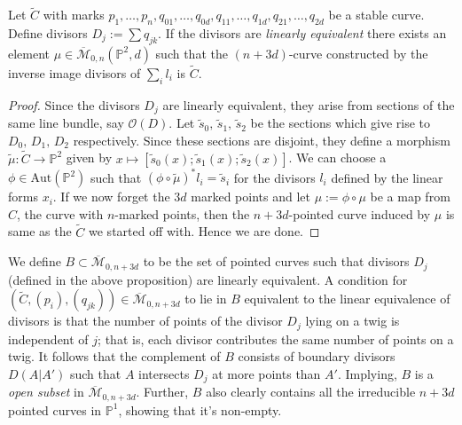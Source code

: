 \begin{proposition}
    Let $\tilde{C}$ with marks $p_{1},\allowbreak \dots,\allowbreak p_{n},\allowbreak q_{01},\allowbreak \dots,\allowbreak q_{0d} ,\allowbreak q_{11},\allowbreak \dots,\allowbreak q_{1d},\allowbreak q_{21},\allowbreak \dots,\allowbreak q_{2d}$ be a stable curve.
    Define divisors $D_{j}:= \sum q_{jk}$.
    If the divisors are \textit{linearly equivalent} there exists an element $\mu \in \overline{\mathcal{M}}_{0,n}(\mathbb{P}^{2},d)$ such that the $(n+3d)$-curve constructed by the inverse image divisors of $\sum_{i}l_{i}$ is $\tilde{C}$.
\end{proposition}
\begin{proof}
    Since the divisors $D_{j}$ are linearly equivalent, they arise from sections of the same line bundle, say $\mathcal{O}(D)$.
    Let $\tilde{s}_{0},\, \tilde{s}_{1},\,\tilde{s}_{2}$ be the sections which give rise to $D_{0},\,D_{1},\,D_{2}$ respectively.
    Since these sections are disjoint, they define a morphism $\tilde{\mu}: \tilde C \to \mathbb{P}^{2}$ given by $x \mapsto [\tilde{s}_{0}(x);\tilde{s}_{1}(x);\tilde{s}_{2}(x)]$.
    We can choose a $\phi \in \text{Aut}(\mathbb{P}^{2})$ such that $(\phi \circ \tilde{\mu})^{*}l_{i} = \tilde{s}_{i}$ for the divisors $l_{i}$ defined by the linear forms $x_{i}$.
    If we now forget the $3d$ marked points and let $\mu := \phi \circ \mu$ be a map from $C$, the curve with $n$-marked points, then the $n+3d$-pointed curve induced by $\mu$ is same as the $\tilde{C}$ we started off with.
    Hence we are done.
\end{proof}

\begin{remark}
    We define $B \subset \overline{\mathcal{M}}_{0,n+3d}$ to be the set of pointed curves such that divisors $D_{j}$ (defined in the above proposition) are linearly equivalent. 
    A condition for $(\tilde C, (p_{i}), (q_{jk})) \in \overline{\mathcal{M}}_{0,n+3d}$ to lie in $B$ equivalent to the linear equivalence of divisors is that the number of points of the divisor $D_{j}$ lying on a twig is independent of $j$; that is, each divisor contributes the same number of points on a twig.
    It follows that the complement of $B$ consists of boundary divisors $D(A|A')$ such that $A$ intersects $D_{j}$ at more points than $A'$. Implying, $B$ is a \textit{open subset} in $\overline{\mathcal{M}}_{0,n+3d}$.
    Further, $B$ also clearly contains all the irreducible $n+3d$ pointed curves in $\mathbb{P}^{1}$, showing that it's non-empty.
\end{remark}

